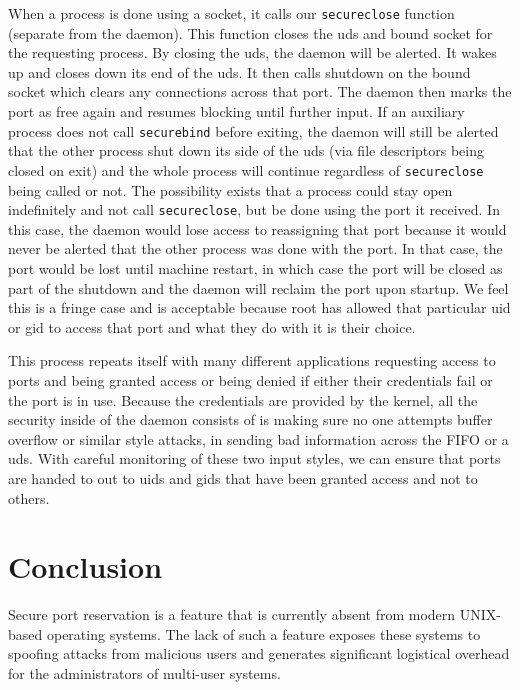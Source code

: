 \documentclass{sig-alternate}
\begin{document}
	When a process is done using a socket, it calls our \texttt{secure\textunderscore close} function (separate from the daemon). This function closes the uds and bound socket for the requesting process. By closing the uds, the daemon will be alerted. It wakes up and closes down its end of the uds. It then calls shutdown on the bound socket which clears any connections across that port. The daemon then marks the port as free again and resumes blocking until further input. If an auxiliary process does not call \texttt{secure\textunderscore bind} before exiting, the daemon will still be alerted that the other process shut down its side of the uds (via file descriptors being closed on exit) and the whole process will continue regardless of \texttt{secure\textunderscore close} being called or not. The possibility exists that a process could stay open indefinitely and not call \texttt{secure\textunderscore close}, but be done using the port it received. In this case, the daemon would lose access to reassigning that port because it would never be alerted that the other process was done with the port. In that case, the port would be lost until machine restart, in which case the port will be closed as part of the shutdown and the daemon will reclaim the port upon startup. We feel this is a fringe case and is acceptable because root has allowed that particular uid or gid to access that port and what they do with it is their choice.
	
	This process repeats itself with many different applications requesting access to ports and being granted access or being denied if either their credentials fail or the port is in use. Because the credentials are provided by the kernel, all the security inside of the daemon consists of is making sure no one attempts buffer overflow or similar style attacks, in sending bad information across the FIFO or a uds. With careful monitoring of these two input styles, we can ensure that ports are handed to out to uids and gids that have been granted access and not to others.

\section{Conclusion}
Secure port reservation is a feature that is currently absent from modern UNIX-based operating systems. The lack of such a feature exposes these systems to spoofing attacks from malicious users and generates significant logistical overhead for the administrators of multi-user systems.
\end{document}
